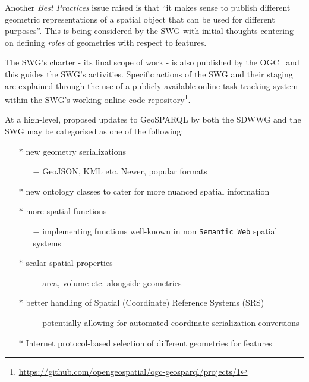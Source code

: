 \documentclass[runningheads]{llncs}
\begin{document}
Another \textit{Best Practices} issue raised is that ``it makes sense to publish different geometric representations 
of a spatial object that can be used for different purposes''. This is being considered by the SWG with initial
thoughts centering on defining \textit{roles} of geometries with respect to features.

The SWG's charter - its final scope of work - is also published by the OGC~\cite{abhayaratna2020ogc} and this guides 
the SWG's activities. Specific actions of the SWG and their staging are explained through the use of a publicly-available 
online task tracking system within the SWG's working online code repository\footnote{\url{https://github.com/opengeospatial/ogc-geosparql/projects/1}}.

At a high-level, proposed updates to GeoSPARQL by both the SDWWG and the SWG may be categorised as one of the following:

\begin{itemize}
    \item[$\ast$] new geometry serializations
    \begin{itemize}
        \item[$-$] GeoJSON, KML etc. Newer, popular formats
    \end{itemize} 
    \item[$\ast$] new ontology classes to cater for more nuanced spatial information
    \item[$\ast$] more spatial functions
    \begin{itemize}
        \item[$-$] implementing functions well-known in non \texttt{Semantic Web} spatial systems
    \end{itemize} 
    \item[$\ast$] scalar spatial properties 
    \begin{itemize}
        \item[$-$] area, volume etc. alongside geometries
    \end{itemize} 
    \item[$\ast$] better handling of Spatial (Coordinate) Reference Systems (SRS)
    \begin{itemize}
        \item[$-$] potentially allowing for automated coordinate serialization conversions
    \end{itemize} 
    \item[$\ast$] Internet protocol-based selection of different geometries for features
\end{itemize}
\end{document}

